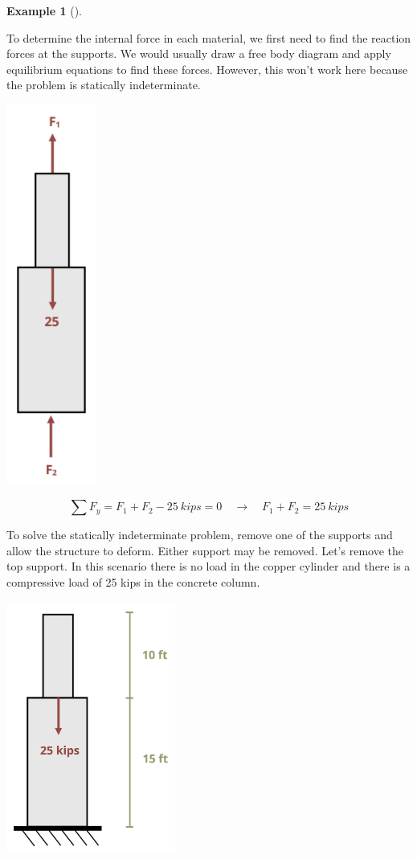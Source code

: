 \documentclass[
  letterpaper,
  DIV=11,
  numbers=noendperiod]{scrreprt}
\theoremstyle{definition}
\newtheorem{example}{Example}[chapter]
\theoremstyle{remark}
\begin{document}
\begin{tcolorbox}
\begin{example}[]
\begin{tcolorbox}
To determine the internal force in each material, we first need to find
the reaction forces at the supports. We would usually draw a free body
diagram and apply equilibrium equations to find these forces. However,
this won't work here because the problem is statically indeterminate.

\begin{center}
\includegraphics[width=1.15625in,height=\textheight]{images/PNGs/Example 5.5 part 2.png}
\end{center}

\[
\sum F_y=F_1+F_2-25{~kips}=0 \quad\rightarrow\quad F_1+F_2=25{~kips}
\]

To solve the statically indeterminate problem, remove one of the
supports and allow the structure to deform. Either support may be
removed. Let's remove the top support. In this scenario there is no load
in the copper cylinder and there is a compressive load of 25 kips in the
concrete column.

\begin{center}
\includegraphics[width=2.1875in,height=\textheight]{images/PNGs/Example 5.5 part 3.png}
\end{center}


\end{tcolorbox}
\end{example}
\end{tcolorbox}
\end{document}
